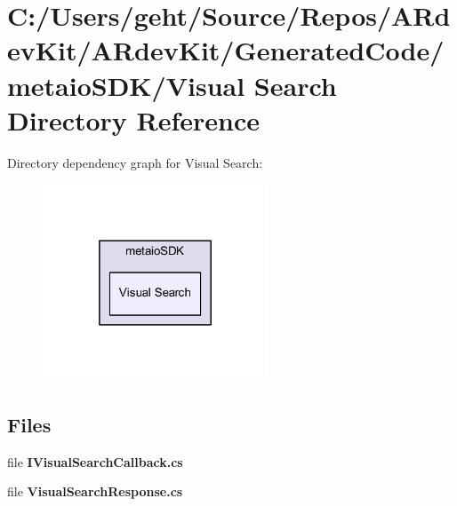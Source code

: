 \section{C\-:/\-Users/geht/\-Source/\-Repos/\-A\-Rdev\-Kit/\-A\-Rdev\-Kit/\-Generated\-Code/metaio\-S\-D\-K/\-Visual Search Directory Reference}
\label{dir_a0682f02ce717c65ce05a73bd87ee5f5}
Directory dependency graph for Visual Search\-:
\nopagebreak
\begin{figure}[H]
\begin{center}
\leavevmode
\includegraphics[width=190pt]{dir_a0682f02ce717c65ce05a73bd87ee5f5_dep}
\end{center}
\end{figure}
\subsection*{Files}
\begin{DoxyCompactItemize}
\item 
file {\bfseries I\-Visual\-Search\-Callback.\-cs}
\item 
file {\bfseries Visual\-Search\-Response.\-cs}
\end{DoxyCompactItemize}
